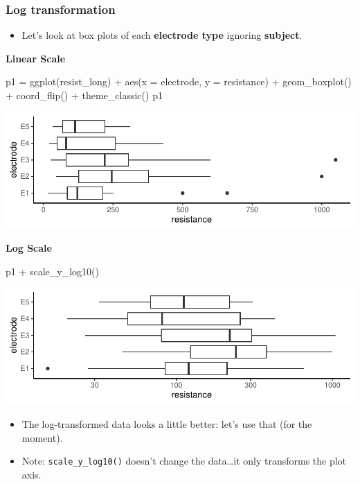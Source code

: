 \documentclass[a4paper]{article}
\begin{document}
\subsubsection{Log transformation}
\begin{itemize}
	\item Let's look at box plots of each \textcolor{mygreen}{\textbf{electrode type}} ignoring \textcolor{myred}{\textbf{subject}}.
\end{itemize}
\begin{minipage}[t]{0.49\textwidth}
\textbf{Linear Scale}
\begin{Schunk}
\begin{Sinput}
p1 = ggplot(resist_long) + 
  aes(x = electrode, y = resistance) + 
  geom_boxplot() + coord_flip() +
  theme_classic()
p1
\end{Sinput}


{\centering \includegraphics[width=\maxwidth]{figure/listings-unnamed-chunk-283-1} 

}

\end{Schunk}
\end{minipage}
\hspace{0.02\textwidth}
\begin{minipage}[t]{0.49\textwidth}
\textbf{Log Scale}
\begin{Schunk}
\begin{Sinput}
p1 + scale_y_log10()
\end{Sinput}


{\centering \includegraphics[width=\maxwidth]{figure/listings-unnamed-chunk-284-1} 

}

\end{Schunk}
\end{minipage}
\begin{itemize}
	\item The log-transformed data looks a little better: let's use that (for the moment).
	\item Note: \lstinline|scale_y_log10()| doesn't change the data\dots it only transforms the plot axis.
\end{itemize}
\end{document}
